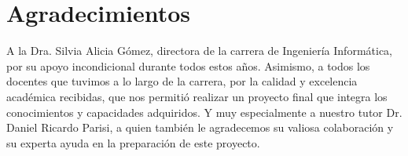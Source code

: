 \documentclass{article}
\begin{document}

\section*{Agradecimientos}
A la Dra. Silvia Alicia G\'omez, directora de la carrera de Ingenier\'ia Inform\'atica, por su apoyo incondicional durante todos estos a\~nos. Asimismo, a todos los docentes que tuvimos a lo largo de la carrera, por la calidad y excelencia acad\'emica recibidas, que nos permiti\'o realizar un proyecto final que integra los conocimientos y capacidades adquiridos.  Y muy especialmente a nuestro tutor Dr. Daniel Ricardo Parisi, a quien tambi\'en le agradecemos su valiosa colaboraci\'on y su experta ayuda en la preparaci\'on de este proyecto.
\end{document}
